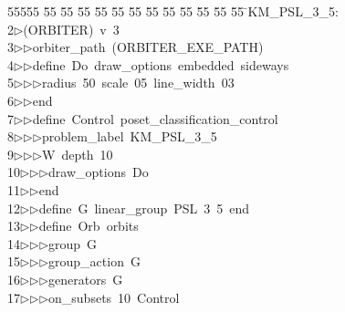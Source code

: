 %
%
\begin{tabbing}
55555 \= 55 \= 55 \= 55 \= 55 \= 55 \= 55 \= 55 \= 55 \= 55 \= 55 \= 55 \= 55 \= \>KM\_PSL\_3\_5:\\[0pt]
2\>$\triangleright$\>(ORBITER)\ v\ 3\ \\[0pt]
3\>$\triangleright$\>$\triangleright$\>orbiter\_path\ (ORBITER\_EXE\_PATH)\ \\[0pt]
4\>$\triangleright$\>$\triangleright$\>define\ Do\ draw\_options\ embedded\ sideways\ \\[0pt]
5\>$\triangleright$\>$\triangleright$\>$\triangleright$\>radius\ 50\ scale\ 05\ line\_width\ 03\ \\[0pt]
6\>$\triangleright$\>$\triangleright$\>end\ \\[0pt]
7\>$\triangleright$\>$\triangleright$\>define\ Control\ poset\_classification\_control\ \\[0pt]
8\>$\triangleright$\>$\triangleright$\>$\triangleright$\>problem\_label\ KM\_PSL\_3\_5\ \\[0pt]
9\>$\triangleright$\>$\triangleright$\>$\triangleright$\>W\ depth\ 10\ \\[0pt]
10\>$\triangleright$\>$\triangleright$\>$\triangleright$\>draw\_options\ Do\ \\[0pt]
11\>$\triangleright$\>$\triangleright$\>end\ \\[0pt]
12\>$\triangleright$\>$\triangleright$\>define\ G\ linear\_group\ PSL\ 3\ 5\ end\ \\[0pt]
13\>$\triangleright$\>$\triangleright$\>define\ Orb\ orbits\ \\[0pt]
14\>$\triangleright$\>$\triangleright$\>$\triangleright$\>group\ G\ \\[0pt]
15\>$\triangleright$\>$\triangleright$\>$\triangleright$\>group\_action\ G\ \\[0pt]
16\>$\triangleright$\>$\triangleright$\>$\triangleright$\>generators\ G\ \\[0pt]
17\>$\triangleright$\>$\triangleright$\>$\triangleright$\>on\_subsets\ 10\ Control\ \\[0pt]

\end{tabbing}
